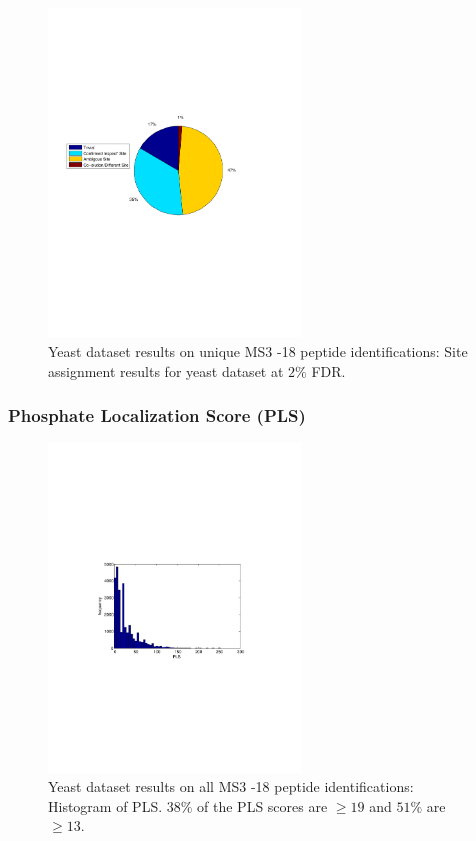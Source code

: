 \begin{figure}[htbp]
\centering %
\includegraphics[trim = 0mm 90mm 20mm 90mm,clip,width=0.6\textwidth]{fig/phospho/allIds/piechart_all_by_STYDE.pdf}
\caption{Yeast dataset results on unique MS3 -18 peptide identifications: Site assignment results for yeast dataset at $2\%$ FDR.}
\label{fig:yeast_piechart_uniqIds_STYDE}
\end{figure}

\clearpage
\subsubsection{Phosphate Localization Score (PLS)}
\begin{figure}[htbp]
\centering %
\includegraphics[trim = 0mm 90mm 20mm 90mm,clip,width=0.6\textwidth]{fig/phospho/allIds/PLS_figs/allIds_PLS_histogram.pdf}
\caption{Yeast dataset results on all MS3 -18 peptide identifications: Histogram of PLS. $38\%$ of the PLS scores are $\ge 19$ and $51\%$ are $\ge 13$.}
\label{fig:yeast_pls}
\end{figure}

